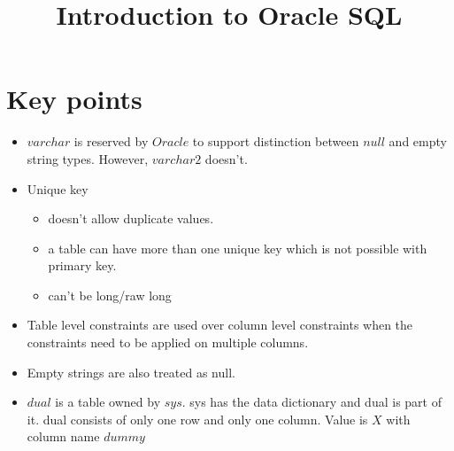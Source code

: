 \documentclass{article}
\begin{document}
\title{Introduction to Oracle SQL}

\maketitle


\section{Key points}
\begin{itemize}
	\item $varchar$ is reserved by $Oracle$ to support distinction between $null$ and empty string types. However, $varchar2$ doesn't. 
	\item Unique key 
	\begin{itemize}
		\item doesn't allow duplicate values. 
		\item a table can have more than one unique key which is not possible with primary key.
		\item can't be long/raw long
	\end{itemize}
	\item Table level constraints are used over column level constraints when the constraints need to be applied on multiple columns.
	\item Empty strings are also treated as null.
	\item $dual$ is a table owned by $sys$. sys has the data dictionary and dual is part of it. dual consists of only one row and only one column. Value is $X$ with column name $dummy$
\end{itemize}
\end{document}
